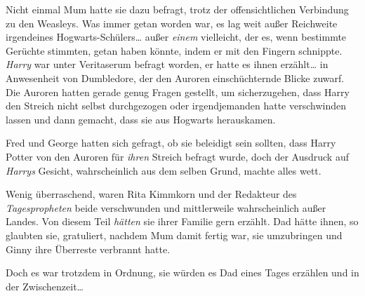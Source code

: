 Nicht einmal Mum hatte sie dazu befragt, trotz der offensichtlichen Verbindung zu den Weasleys. Was immer getan worden war, es lag weit außer Reichweite irgendeines Hogwarts-Schülers… außer \emph{einem} vielleicht, der es, wenn bestimmte Gerüchte stimmten, getan haben könnte, indem er mit den Fingern schnippte. \emph{Harry} war unter Veritaserum befragt worden, er hatte es ihnen erzählt… in Anwesenheit von Dumbledore, der den Auroren einschüchternde Blicke zuwarf. Die Auroren hatten gerade genug Fragen gestellt, um sicherzugehen, dass Harry den Streich nicht selbst durchgezogen oder irgendjemanden hatte verschwinden lassen und dann gemacht, dass sie aus Hogwarts herauskamen.

Fred und George hatten sich gefragt, ob sie beleidigt sein sollten, dass Harry Potter von den Auroren für \emph{ihren} Streich befragt wurde, doch der Ausdruck auf \emph{Harrys} Gesicht, wahrscheinlich aus dem selben Grund, machte alles wett.

Wenig überraschend, waren Rita Kimmkorn und der Redakteur des \emph{Tagespropheten} beide verschwunden und mittlerweile wahrscheinlich außer Landes. Von diesem Teil \emph{hätten} sie ihrer Familie gern erzählt. Dad hätte ihnen, so glaubten sie, gratuliert, nachdem Mum damit fertig war, sie umzubringen und Ginny ihre Überreste verbrannt hatte.

Doch es war trotzdem in Ordnung, sie würden es Dad eines Tages erzählen und in der Zwischenzeit…

